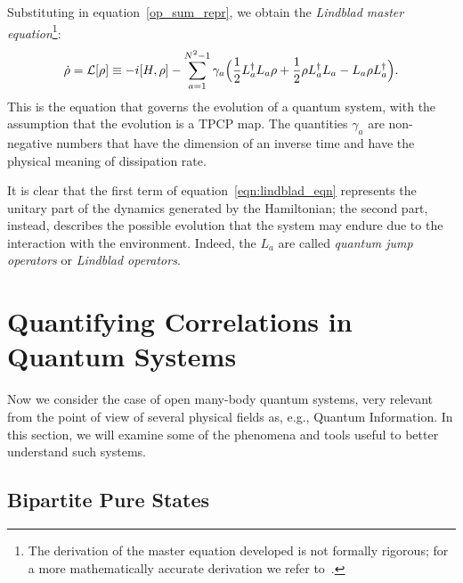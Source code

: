 Substituting in equation~\ref{op_sum_repr}, we obtain the \emph{Lindblad master equation}\footnote{The derivation of the master equation developed is not formally rigorous; for a more mathematically accurate derivation we refer to~\cite{pet_breuer:open_quantum}.}:
\begin{equation}
\label{eqn:lindblad_eqn}
    \dot{\rho} = \mathcal{L}[\rho] \equiv -i[H, \rho] - \sum_{a=1}^{N^2-1} \gamma_a \Bigl(\frac{1}{2}L_a^{\dagger}L_a\rho + \frac{1}{2}\rho L_a^{\dagger}L_a - L_a\rho L_a^{\dagger}\Bigl).
\end{equation}
This is the equation that governs the evolution of a quantum system, with the assumption that the evolution is a TPCP map. The quantities $\gamma_a$ are non-negative numbers that have the dimension of an inverse time and have the physical meaning of dissipation rate.

It is clear that the first term of equation~\ref{eqn:lindblad_eqn} represents the unitary part of the dynamics generated by the Hamiltonian; the second part, instead, describes the possible evolution that the system may endure due to the interaction with the environment. Indeed, the $L_a$ are called \emph{quantum jump operators} or \emph{Lindblad operators}.



\section{Quantifying Correlations in Quantum Systems}
\label{many_body_oqs}
Now we consider the case of open many-body quantum systems, very relevant from the point of view of several physical fields as, e.g., Quantum Information. In this section, we will examine some of the phenomena and tools useful to better understand such systems. 

\subsection{Bipartite Pure States}

